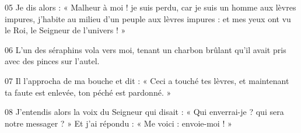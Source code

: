 
05 Je dis alors : « Malheur à moi ! je suis perdu, car je suis un homme aux lèvres impures, j’habite au milieu d’un peuple aux lèvres impures : et mes yeux ont vu le Roi, le Seigneur de l’univers ! »

06 L’un des séraphins vola vers moi, tenant un charbon brûlant qu’il avait pris avec des pinces sur l’autel.

07 Il l’approcha de ma bouche et dit : « Ceci a touché tes lèvres, et maintenant ta faute est enlevée, ton péché est pardonné. »

08 J’entendis alors la voix du Seigneur qui disait : « Qui enverrai-je ? qui sera notre messager ? » Et j’ai répondu : « Me voici : envoie-moi ! »
